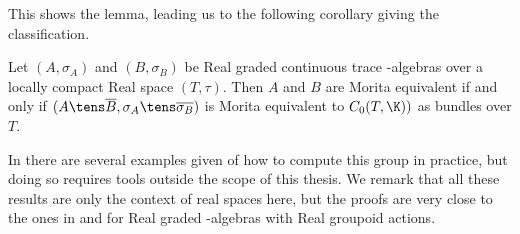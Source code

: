This shows the lemma, leading us to the following corollary giving the classification. 
\begin{corollary}
	Let $(A,\sigma_A)$ and $(B,\sigma_B)$ be Real graded continuous trace \Cstar-algebras over a locally compact Real space $(T,\tau)$. Then $A$ and $B$ are Morita equivalent if and only if $(A\tens \overline{B},\sigma_A \tens \overline{\sigma_B})$ is Morita equivalent to $C_0(T,\K))$ as bundles over $T$. 
\end{corollary}

In \cite{rosenberg} there are several examples given of how to compute this group in practice, but doing so requires tools outside the scope of this thesis. We remark that all these results are only the context of real spaces here, but the proofs are very close to the ones in \cite{moutou} and \cite{renault} for Real graded \Cstar-algebras with Real groupoid actions. 
